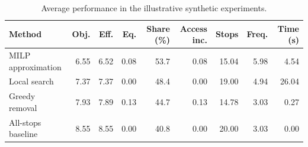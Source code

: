 \begin{table}[htbp]
\centering
\small
\caption{Average performance in the illustrative synthetic experiments.}
\label{tab:small_scale_summary}
\begin{tabular}{lrrrrrrrr}
\toprule
Method & Obj. & Eff. & Eq. & Share (\%) & Access inc. & Stops & Freq. & Time (s) \\
\midrule
MILP approximation & 6.55 & 6.52 & 0.08 & 53.7 & 0.08 & 15.04 & 5.98 & 4.54 \\
Local search & 7.37 & 7.37 & 0.00 & 48.4 & 0.00 & 19.00 & 4.94 & 26.04 \\
Greedy removal & 7.93 & 7.89 & 0.13 & 44.7 & 0.13 & 14.78 & 3.03 & 0.27 \\
All-stops baseline & 8.55 & 8.55 & 0.00 & 40.8 & 0.00 & 20.00 & 3.03 & 0.00 \\
\bottomrule
\end{tabular}
\end{table}
